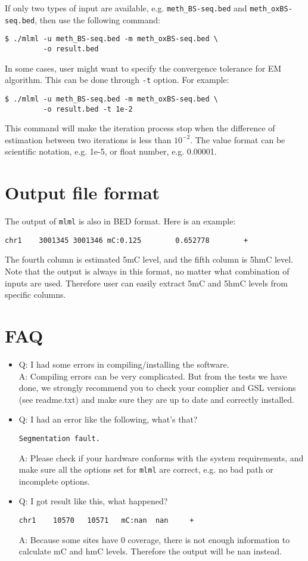 \documentclass[11pt]{article}
\newcommand{\prog}[1]{\texttt{#1}}
\newcommand{\fn}[1]{\texttt{#1}}
\newcommand{\op}[1]{\texttt{#1}}
\begin{document}
If only two types of input are available, e.g. \fn{meth\_BS-seq.bed} and \fn{meth\_oxBS-seq.bed}, then use the following command:
\begin{verbatim}
$ ./mlml -u meth_BS-seq.bed -m meth_oxBS-seq.bed \
         -o result.bed
\end{verbatim}

In some cases, user might want to specify the convergence tolerance for EM algorithm. This can be done through \op{-t} option. For example:
\begin{verbatim}
$ ./mlml -u meth_BS-seq.bed -m meth_oxBS-seq.bed \
         -o result.bed -t 1e-2
\end{verbatim}
This command will make the iteration process stop when the difference of estimation between two iterations is less than $10^{-2}$. The value format can be scientific notation, e.g. 1e-5, or float number, e.g. 0.00001.

\section{Output file format}	
The output of \prog{mlml} is also in BED format. Here is an example:
\begin{verbatim}
chr1    3001345 3001346 mC:0.125        0.652778        +
\end{verbatim}
The fourth column is estimated 5mC level, and the fifth column is 5hmC level. Note that the output is always in this format, no matter what combination of inputs are used. Therefore user can easily extract 5mC and 5hmC levels from specific columns.

\section{FAQ}
\begin{itemize}
\item Q: I had some errors in compiling/installing the software.\\
A: Compiling errors can be very complicated. But from the tests we have done, we strongly recommend you to check your complier and GSL versions (see readme.txt) and make sure they are up to date and correctly installed.

\item Q: I had an error like the following, what's that?
\begin{verbatim}
Segmentation fault.
\end{verbatim}
A: Please check if your hardware conforms with the system requirements, and make sure all the options set for \prog{mlml} are correct, e.g. no bad path or incomplete options.

\item Q: I got result like this, what happened?
\begin{verbatim}
chr1    10570   10571   mC:nan  nan     +
\end{verbatim}
A: Because some sites have 0 coverage, there is not enough information to calculate mC and hmC levels. Therefore the output will be nan instead.
\end{itemize}
\end{document}

